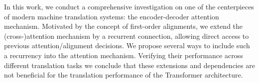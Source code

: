 In this work, we conduct a comprehensive investigation on one of the centerpieces of modern machine translation systems: the encoder-decoder attention mechanism. Motivated by the concept of first-order alignments, we extend the (cross-)attention mechanism by a recurrent connection, allowing direct access to previous attention/alignment decisions. We propose several ways to include such a recurrency into the attention mechanism. Verifying their performance across different translation tasks we conclude that these extensions and dependencies are not beneficial for the translation performance of the Transformer architecture.
